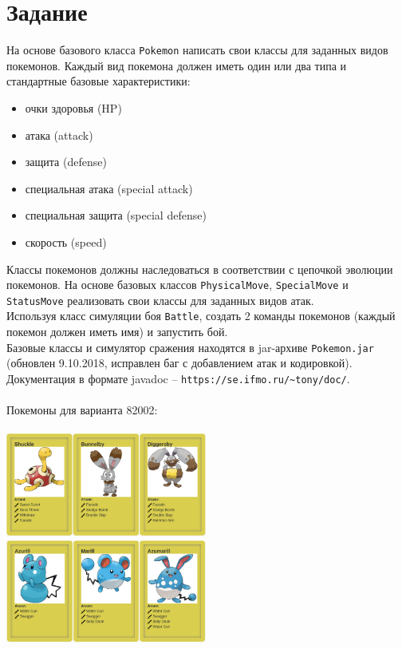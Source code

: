 \documentclass[11pt]{article}
\begin{document}
\section{Задание}
На основе базового класса \texttt{Pokemon} написать свои классы для заданных видов покемонов. Каждый вид покемона должен иметь один или два типа и стандартные базовые характеристики:
\begin{itemize}
	\item очки здоровья (HP)
	\item атака (attack)
	\item защита (defense)
	\item специальная атака (special attack)
	\item специальная защита (special defense)
	\item скорость (speed)
\end{itemize}
Классы покемонов должны наследоваться в соответствии с цепочкой эволюции покемонов. На основе базовых классов \texttt{PhysicalMove}, \texttt{SpecialMove} и \texttt{StatusMove} реализовать свои классы для заданных видов атак.\\
Используя класс симуляции боя \texttt{Battle}, создать 2 команды покемонов (каждый покемон должен иметь имя) и запустить бой.\\
Базовые классы и симулятор сражения находятся в jar-архиве \texttt{Pokemon.jar} (обновлен 9.10.2018, исправлен баг с добавлением атак и кодировкой). 
Документация в формате javadoc -- \texttt{https://se.ifmo.ru/\~{}tony/doc/}.\\\\
Покемоны для варианта 82002:\\\\
\includegraphics[width=250px]{../cards.png}\\
\includegraphics[width=250px]{../cards1.png}
\pagebreak
\end{document}

